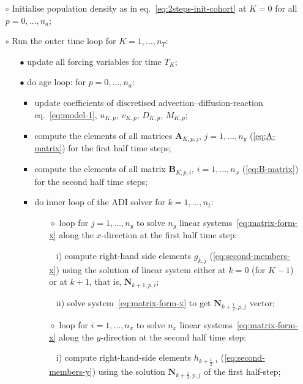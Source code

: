 \begin{itemize}
\item[$\circ$] Initialise population density as in eq.~\eqref{eq:2steps-init-cohort} at $K=0$ for all $p=0,\dots,n_a$;
\item[$\circ$] Run the outer time loop for $K=1,\dots,n_T$:
   \begin{itemize}
   \item[$\bullet$] update all forcing variables for time $T_K$;
   \item[$\bullet$] do age loop: for $p=0,\dots,n_a$:
     \begin{itemize}
     \item update coefficients of discretised advection--diffusion-reaction eq.~\eqref{eq:model-1}, $u_{K,p}$, $v_{K,p}$, $D_{K,p}$, $M_{K,p}$; 
     \item compute the elements of all matrices $\mathbf{A}_{K,p,j}$, $j=1,\dots,n_y$  (\ref{eq:A-matrix}) for the first half time steps;
     \item compute the elements of all matrix $\mathbf{B}_{K,p,i}$, $i=1,\dots,n_x$ (\ref{eq:B-matrix}) for the second half time steps;
     \item do inner loop of the ADI solver for $k=1,\dots, n_t$:
          \begin{itemize}
          \item[$\diamond$] loop for $j=1,\dots,n_y$ to solve $n_y$ linear systems~\eqref{eq:matrix-form-x} along the $x$-direction at the first half time step:
               \item[] \mbox{ } i) compute right-hand side elements $g_{k,j}$ (\ref{eq:second-members-x}) using the solution of linear system either at $k=0$ (for $K-1$) or at $k+1$, that is, $\mathbf{N}_{k+1,p,i}$;
               \item[] \mbox{ } ii) solve system~\eqref{eq:matrix-form-x} to get $\mathbf{N}_{k+\frac{1}{2},p,j}$ vector;
          \item[$\diamond$] loop for $i=1,\dots, n_x$ to solve $n_x$ linear systems~\eqref{eq:matrix-form-x} along the $y$-direction at the second half time step:
               \item[] \mbox{ } i) compute right-hand-side elements $h_{k+\frac{1}{2},i}$ (\ref{eq:second-members-y}) using the solution $\mathbf{N}_{k+\frac{1}{2},p,j}$ of the first half-step;

\end{itemize}
\end{itemize}
\end{itemize}
\end{itemize}
